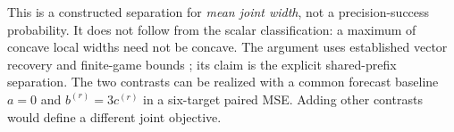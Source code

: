 This is a constructed separation for \emph{mean joint width}, not a
precision-success probability.  It does not follow from the scalar
classification: a maximum of concave local widths need not be concave.
The argument uses established vector recovery and finite-game bounds
\citep{krieg2025}; its claim is the explicit shared-prefix separation.
The two contrasts can be realized with a common forecast baseline
$a=0$ and $b^{(r)}=3c^{(r)}$ in a six-target paired MSE.  Adding other
contrasts would define a different joint objective.
